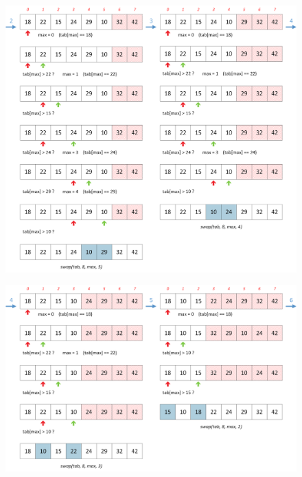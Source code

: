 \documentclass[11pt,a4paper]{article}
\begin{document}
\begin{figure}[ht!]
\centering
\centerline{
\includegraphics[width=1.2\textwidth]{img/tris/2_per_pages/SelectionSort_part2.png}
}
\end{figure}

\vfillLast

\clearpage

\begin{figure}[ht!]
\centering
\centerline{
\includegraphics[width=1.2\textwidth]{img/tris/2_per_pages/SelectionSort_part3.png}
}
\end{figure}
\end{document}
